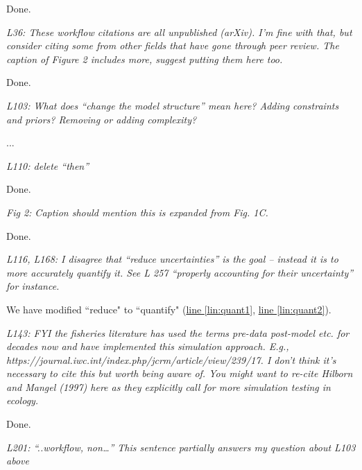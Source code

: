 \documentclass[11pt,letter]{article}
\begin{document}
Done.

\begin{mybox}
\emph{L36: These workflow citations are all unpublished (arXiv). I’m fine with that, but consider citing some from other fields that have gone through peer review. The caption of Figure 2 includes more, suggest putting them here too.}
\end{mybox}

Done.

\begin{mybox}
\emph{L103: What does “change the model structure” mean here? Adding constraints and priors? Removing or adding complexity?}
\end{mybox}

...

\begin{mybox}
\emph{L110: delete “then”}
\end{mybox}

Done. %

\begin{mybox}
\emph{Fig 2: Caption should mention this is expanded from Fig. 1C.}
\end{mybox}

Done.

\begin{mybox}
\emph{L116, L168: I disagree that “reduce uncertainties” is the goal – instead it is to more accurately quantify it. See L 257 “properly accounting for their uncertainty” for instance.}
\end{mybox}

We have modified ``reduce" to ``quantify" (\href{file:forecastflows_r1\#lintarget:quant1}{line \ref*{lin:quant1}}, \href{file:forecastflows_r1\#lintarget:quant2}{line \ref*{lin:quant2}}).

\begin{mybox}
\emph{L143: FYI the fisheries literature has used the terms pre-data post-model etc. for decades now and have implemented this simulation approach. E.g., https://journal.iwc.int/index.php/jcrm/article/view/239/17. I don’t think it’s necessary to cite this but worth being aware of. You might want to re-cite Hilborn and Mangel (1997) here as they explicitly call for more simulation testing in ecology.}
\end{mybox}

Done.

\begin{mybox}
\emph{L201: “..workflow, non…” This sentence partially answers my question about L103 above}
\end{mybox}
\end{document}
